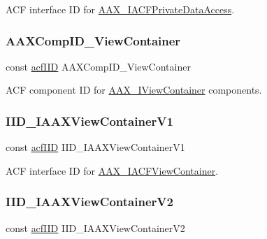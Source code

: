 A\+CF interface ID for \mbox{\hyperlink{a01741}{A\+A\+X\+\_\+\+I\+A\+C\+F\+Private\+Data\+Access}}. 

\mbox{\label{a00683_a2e198bb97b311f9919ad1f61862be5e9}} 
\subsubsection{\texorpdfstring{AAXCompID\_ViewContainer}{AAXCompID\_ViewContainer}}
{\footnotesize\ttfamily const \mbox{\hyperlink{a00269_a59df0b41744eee7a066787aaedf97f67}{acf\+I\+ID}} A\+A\+X\+Comp\+I\+D\+\_\+\+View\+Container}



A\+CF component ID for \mbox{\hyperlink{a01889}{A\+A\+X\+\_\+\+I\+View\+Container}} components. 

\mbox{\label{a00683_a854aa90e4fa7f91dae9282fe008d4005}} 
\subsubsection{\texorpdfstring{IID\_IAAXViewContainerV1}{IID\_IAAXViewContainerV1}}
{\footnotesize\ttfamily const \mbox{\hyperlink{a00269_a59df0b41744eee7a066787aaedf97f67}{acf\+I\+ID}} I\+I\+D\+\_\+\+I\+A\+A\+X\+View\+Container\+V1}



A\+CF interface ID for \mbox{\hyperlink{a01765}{A\+A\+X\+\_\+\+I\+A\+C\+F\+View\+Container}}. 

\mbox{\label{a00683_ade506fadfb23a9f4deb4be228b1f6fa8}} 
\subsubsection{\texorpdfstring{IID\_IAAXViewContainerV2}{IID\_IAAXViewContainerV2}}
{\footnotesize\ttfamily const \mbox{\hyperlink{a00269_a59df0b41744eee7a066787aaedf97f67}{acf\+I\+ID}} I\+I\+D\+\_\+\+I\+A\+A\+X\+View\+Container\+V2}



